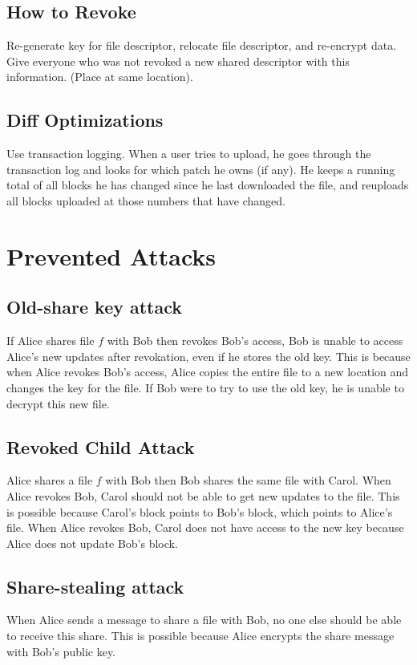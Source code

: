 \documentclass{article}
\begin{document}
\subsection{How to Revoke}
Re-generate key for file descriptor, relocate file descriptor, and re-encrypt data.
Give everyone who was not revoked a new shared descriptor with this information.
(Place at same location).

\subsection{Diff Optimizations}
Use transaction logging.
When a user tries to upload, he goes through the transaction log and looks for which patch he owns (if any).
He keeps a running total of all blocks he has changed since he last downloaded the file, and reuploads all blocks uploaded at those numbers that have changed.

\section{Prevented Attacks}
\subsection{Old-share key attack}
If Alice shares file $f$ with Bob then revokes Bob's access, Bob is unable to access Alice's new updates
after revokation, even if he stores the old key.
This is because when Alice revokes Bob's access, Alice copies the entire file to a new location and changes
the key for the file.
If Bob were to try to use the old key, he is unable to decrypt this new file.

\subsection{Revoked Child Attack}
Alice shares a file $f$ with Bob then Bob shares the same file with Carol. 
When Alice revokes Bob, Carol should not be able to get new updates to the file.
This is possible because Carol's block points to Bob's block, which points to Alice's file.
When Alice revokes Bob, Carol does not have access to the new key because Alice does not update
Bob's block.

\subsection{Share-stealing attack}
When Alice sends a message to share a file with Bob, no one else should be able to receive this share.
This is possible because Alice encrypts the share message with Bob's public key.
\end{document}
